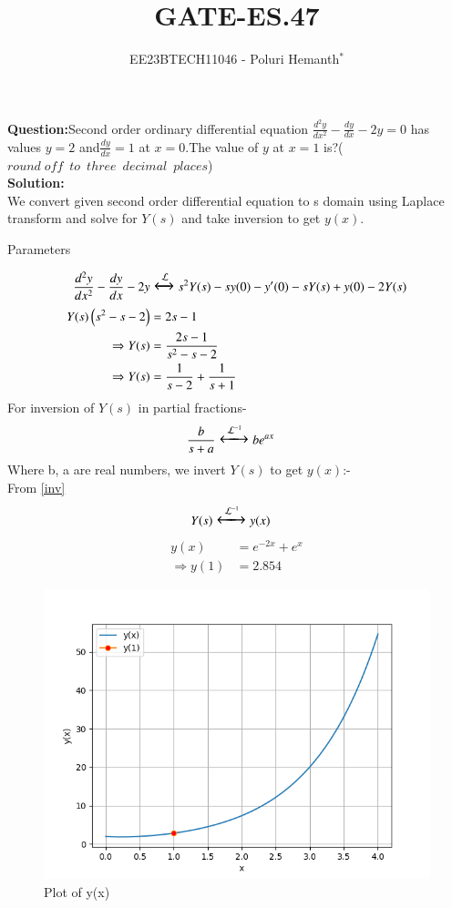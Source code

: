 \documentclass[journal,12pt,twocolumn]{IEEEtran}
\theoremstyle{remark}
\begin{document}

\vspace{3cm}

\title{GATE-ES.47}
\author{EE23BTECH11046 - Poluri Hemanth$^{*}$}
\maketitle
\textbf{Question:}Second order ordinary differential equation $\frac{d^2y}{dx^2}-\frac{dy}{dx}-2y=0$ has values 
$y=2$ and$\frac{dy}{dx}=1$ at $x=0$.The value of $y$ at $x=1$ is?($round\; off\;\: to\;\: three\;\: decimal\;\: places$)
\\
\textbf{Solution:}\\
We convert given second order differential equation to s domain using Laplace transform and solve for $Y(s)$ and take inversion to get $y(x)$.
\begin{table}[h!]
        
        \caption{Parameters}
        \label{tab:es.47}
\end{table}
\begin{align}
    \frac{d^2y}{dx^2}-\frac{dy}{dx}-2y&\Large\xleftrightarrow{\mathcal{L}}s^2Y(s)-sy(0)-y'(0)-sY(s)+y(0)-2Y(s)\\
    Y(s)\left(s^2-s-2\right)&=2s-1\\
    \Rightarrow Y(s)&=\frac{2s-1}{s^2-s-2}\\
    \Rightarrow Y(s)&=\frac{1}{s-2}+\frac{1}{s+1}
\end{align}
For inversion of $Y(s)$ in partial fractions-
\begin{align}
    &\frac{b}{s+a}\Large\xleftrightarrow{\mathcal{L}^{-1}}be^{ax}\label{inv}
\end{align}
Where b, a are real numbers, we invert $Y(s)$ to get $y(x)$:-\\
From \eqref{inv}
\begin{align}
    &Y(s)\Large\xleftrightarrow{\mathcal{L}^{-1}} y(x)
\end{align}
\begin{align}
    y(x)&=e^{-2x}+e^{x}\\
   \Rightarrow y(1)&=2.854
\end{align}
\begin{figure}[h!]
    \centering
    \includegraphics[width=1\linewidth]{gate-1.png}
	\caption{Plot of y(x)}
    \label{fig:enter-label}
\end{figure}
\end{document}
